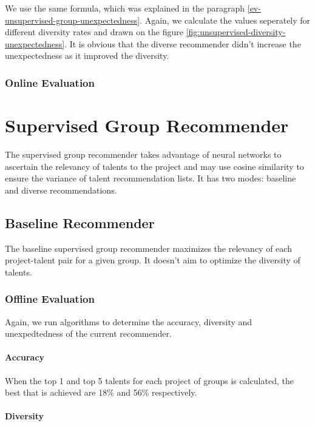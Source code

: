 We use the same formula, which was explained in the paragraph \ref{ev-unsupervised-group-unexpectedness}. Again, we calculate the values seperately for different diversity rates and drawn on the figure \ref{fig:unsupervised-diversity-unexpectedness}. It is obvious that the diverse recommender didn't increase the unexpectedness as it improved the diversity.


\subsubsection{Online Evaluation}


\section{Supervised Group Recommender}

The supervised group recommender takes advantage of neural networks to ascertain the relevancy of talents to the project and may use cosine similarity to ensure the variance of talent recommendation lists. It has two modes: baseline and diverse recommendations.


\subsection{Baseline Recommender}

The baseline supervised group recommender maximizes the relevancy of each project-talent pair for a given group. It doesn't aim to optimize the diversity of talents. 

\subsubsection{Offline Evaluation}

Again, we run algorithms to determine the accuracy, diversity and unexpedtedness of the current recommender.

\paragraph{Accuracy}

When the top 1 and top 5 talents for each project of groups is calculated, the best that is achieved are 18\% and 56\% respectively. 

\paragraph{Diversity}

